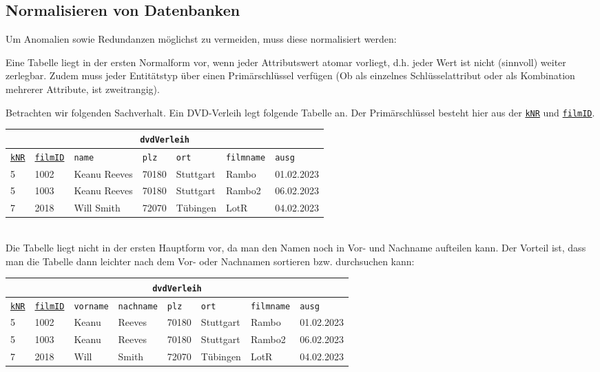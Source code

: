 \subsection[Normalisieren]{Normalisieren von Datenbanken}
Um Anomalien sowie Redundanzen möglichst zu vermeiden, muss diese normalisiert werden:
\begin{tcolorbox}[title=Erste Normalform]
	Eine Tabelle liegt in der ersten Normalform vor, wenn jeder Attributswert atomar vorliegt, d.h. jeder Wert ist nicht (sinnvoll) weiter zerlegbar. Zudem muss jeder Entitätstyp über einen Primärschlüssel verfügen (Ob als einzelnes Schlüsselattribut oder als Kombination mehrerer Attribute, ist zweitrangig).
\end{tcolorbox}
Betrachten wir folgenden Sachverhalt. Ein DVD-Verleih legt folgende Tabelle an. Der Primärschlüssel besteht hier aus der \underline{\lstinline!kNR!} und \underline{\lstinline!filmID!}.
\begin{tabular}{lllllll}
	\multicolumn{7}{c}{\lstinline!dvdVerleih!}\\
	\hline
	\underline{\lstinline!kNR!}&\underline{\lstinline!filmID!}&\lstinline!name!&\lstinline!plz!&\lstinline!ort!&\lstinline!filmname!&\lstinline!ausg!\\
	\hline
	5&1002&Keanu Reeves&70180&Stuttgart&Rambo&01.02.2023\\
	5&1003&Keanu Reeves&70180&Stuttgart&Rambo2&06.02.2023\\
	7&2018&Will Smith&72070&Tübingen&LotR&04.02.2023\\
\end{tabular}\\
Die Tabelle liegt nicht in der ersten Hauptform vor, da man den Namen noch in Vor- und Nachname aufteilen kann. Der Vorteil ist, dass man die Tabelle dann leichter nach dem Vor- oder Nachnamen sortieren bzw. durchsuchen kann:
\begin{tabular}{llllllll}
	\multicolumn{8}{c}{\lstinline!dvdVerleih!}\\
	\hline
	\underline{\lstinline!kNR!}&\underline{\lstinline!filmID!}&\lstinline!vorname!&\lstinline!nachname!&\lstinline!plz!&\lstinline!ort!&\lstinline!filmname!&\lstinline!ausg!\\
	\hline
	5&1002&Keanu&Reeves&70180&Stuttgart&Rambo&01.02.2023\\
	5&1003&Keanu&Reeves&70180&Stuttgart&Rambo2&06.02.2023\\
	7&2018&Will&Smith&72070&Tübingen&LotR&04.02.2023\\
\end{tabular}

